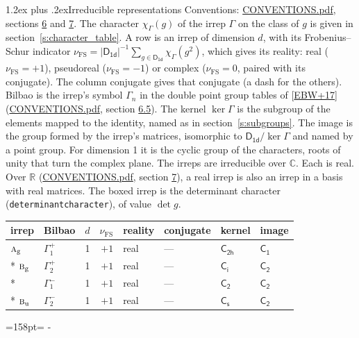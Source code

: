 \documentclass[10pt,a4paper]{article}
\makeatletter
\renewcommand\section{\@startsection{section}{1}{\z@}{-3ex plus -1ex minus -.2ex}%
  {1.2ex plus .2ex}{\normalfont\large\sffamily\bfseries\color{parttitle}}}
\newcommand{\needspace}[1]{\par\penalty-100\begingroup\dimen0=#1\relax\dimen2=\pagegoal
  \advance\dimen2-\pagetotal\ifdim\dimen0>\dimen2\relax\ifdim\dimen2>0pt\vfil\break\fi\fi
  \endgroup}
\numberwithin{equation}{section}
\newcommand{\grp}[1]{\mathsf{#1}}
\newcommand{\irr}[1]{\text{\normalfont\scshape #1}}
\newcommand{\detbox}[1]{{\setlength{\fboxsep}{1pt}\fbox{#1}}}
\newcommand{\ptag}[1]{\mathrm{#1}}
\newcommand{\irchar}[1]{\chi_{#1}}
\newcommand{\fsind}{\nu_{\mathrm{FS}}}
\makeatother
\begin{document}
\section{Irreducible representations}\label{s:irreps}
Conventions: \href{../../CONVENTIONS.pdf}{CONVENTIONS.pdf}, sections \href{../../CONVENTIONS.pdf\#conv.6}{6} and \href{../../CONVENTIONS.pdf\#conv.7}{7}.
\leavevmode\label{n:function.character}\label{n:irrep.Gamma}The character $\irchar{\Gamma}(g)$ of the irrep $\Gamma$ on the class of $g$ is given in section~\ref{s:character_table}.
\leavevmode\label{n:index.dimension}\label{n:index.frobenius}\label{n:head.irrep}\label{n:head.reality}A row is an irrep of dimension $d$, with its Frobenius--Schur indicator $\fsind = |\grp{D_{1d}}|^{-1}\allowbreak\sum_{g\in\grp{D_{1d}}}\irchar{\Gamma}(g^2)$, which gives its reality: real ($\fsind = +1$), pseudoreal ($\fsind = -1$) or complex ($\fsind = 0$, paired with its conjugate). \label{n:head.conjugate}The column conjugate gives that conjugate (a dash for the others). \label{n:head.bilbao}\label{n:irrep.alias.gamma}Bilbao is the irrep's symbol $\Gamma_n$ in the double point group tables of [\href{../../../REFERENCES.pdf\#ref.EBW+17}{EBW+17}] (\href{../../CONVENTIONS.pdf}{CONVENTIONS.pdf}, section \href{../../CONVENTIONS.pdf\#conv.6.5}{6.5}). \label{n:head.kernel}The kernel $\ker\Gamma$ is the subgroup of the elements mapped to the identity, named as in section~\ref{s:subgroups}. \label{n:head.image}The image is the group formed by the irrep's matrices, isomorphic to $\grp{D_{1d}}/\ker\Gamma$ and named by a point group. For dimension 1 it is the cyclic group of the characters, roots of unity that turn the complex plane. The irreps are irreducible over $\mathbb{C}$. Each is real. Over $\mathbb{R}$ (\href{../../CONVENTIONS.pdf}{CONVENTIONS.pdf}, section \href{../../CONVENTIONS.pdf\#conv.7}{7}), a real irrep is also an irrep in a basis with real matrices. \label{n:mark.determinant}The boxed irrep is the determinant character (\texttt{determinantcharacter}), of value $\det g$.
\setlength{\emergencystretch}{2em}\par\setlength{\emergencystretch}{0pt}
{\small\renewcommand{\arraystretch}{1.25}\begin{longtable}{@{}llrrllll@{}}\toprule
irrep & Bilbao & $d$ & $\fsind$ & reality & conjugate & kernel & image\\\midrule\endhead
\bottomrule\endfoot\endlastfoot
$\irr{a}_{\ptag{g}}$ & $\Gamma_{1}^{+}$ & 1 & $+1$ & real & --- & \href{C2h.pdf}{$\grp{C_{2h}}$} & \href{C1.pdf}{$\grp{C_{1}}$}\\*
$\irr{b}_{\ptag{g}}$ & $\Gamma_{2}^{+}$ & 1 & $+1$ & real & --- & \href{S2.pdf}{$\grp{C_{i}}$} & \href{C2.pdf}{$\grp{C_{2}}$}\\*
\detbox{$\irr{a}_{\ptag{u}}$} & $\Gamma_{1}^{-}$ & 1 & $+1$ & real & --- & \href{C2.pdf}{$\grp{C_{2}}$} & \href{C2.pdf}{$\grp{C_{2}}$}\\*
$\irr{b}_{\ptag{u}}$ & $\Gamma_{2}^{-}$ & 1 & $+1$ & real & --- & \href{C1v.pdf}{$\grp{C_{s}}$} & \href{C2.pdf}{$\grp{C_{2}}$}\\
\bottomrule\end{longtable}}
\needspace{158pt}
\end{document}
